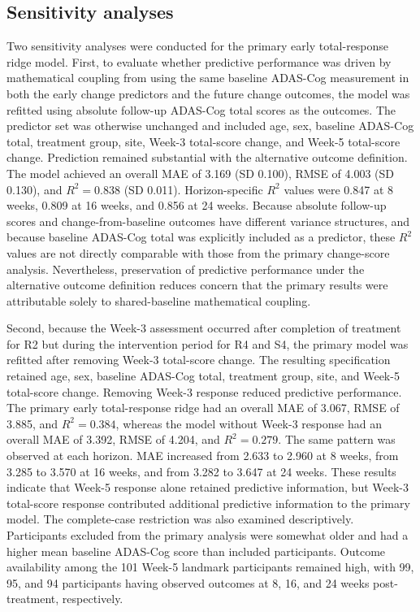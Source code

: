 \documentclass[11pt]{article}
\begin{document}
\subsection{Sensitivity analyses}

Two sensitivity analyses were conducted for the primary early
total-response ridge model. First, to evaluate whether predictive performance was driven by
mathematical coupling from using the same baseline ADAS-Cog measurement
in both the early change predictors and the future change outcomes,
the model was refitted using absolute follow-up ADAS-Cog total scores
as the outcomes. The predictor set was otherwise unchanged and included
age, sex, baseline ADAS-Cog total, treatment group, site, Week-3
total-score change, and Week-5 total-score change. Prediction remained substantial with the alternative outcome definition.
The model achieved an overall MAE of 3.169 (SD 0.100), RMSE of
4.003 (SD 0.130), and $R^2=0.838$ (SD 0.011). Horizon-specific
$R^2$ values were 0.847 at 8 weeks, 0.809 at 16 weeks, and
0.856 at 24 weeks. Because absolute follow-up scores and
change-from-baseline outcomes have different variance structures, and
because baseline ADAS-Cog total was explicitly included as a predictor,
these $R^2$ values are not directly comparable with those from the
primary change-score analysis. Nevertheless, preservation of predictive
performance under the alternative outcome definition reduces concern
that the primary results were attributable solely to shared-baseline
mathematical coupling.

Second, because the Week-3 assessment occurred after completion of
treatment for R2 but during the intervention period for R4 and S4,
the primary model was refitted after removing Week-3 total-score change.
The resulting specification retained age, sex, baseline ADAS-Cog total,
treatment group, site, and Week-5 total-score change. Removing Week-3 response reduced predictive performance. The primary
early total-response ridge had an overall MAE of 3.067, RMSE of 3.885,
and $R^2=0.384$, whereas the model without Week-3 response had an
overall MAE of 3.392, RMSE of 4.204, and $R^2=0.279$. The same
pattern was observed at each horizon. MAE increased from 2.633 to
2.960 at 8 weeks, from 3.285 to 3.570 at 16 weeks, and from
3.282 to 3.647 at 24 weeks. These results indicate that Week-5
response alone retained predictive information, but Week-3 total-score
response contributed additional predictive information to the primary
model. The complete-case restriction was also examined descriptively.
Participants excluded from the primary analysis were somewhat older
and had a higher mean baseline ADAS-Cog score than included participants.
Outcome availability among the 101 Week-5 landmark participants remained
high, with 99, 95, and 94 participants having observed outcomes at
8, 16, and 24 weeks post-treatment, respectively.
\end{document}
